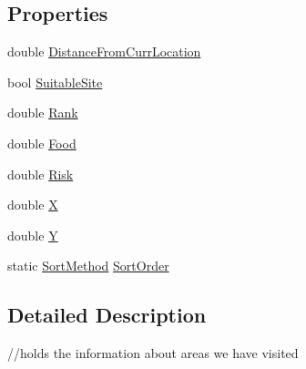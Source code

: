 \subsection*{Properties}
\begin{DoxyCompactItemize}
\item 
double \hyperlink{class_s_e_a_r_c_h_1_1_eligible_home_site_ad52a57d64d311a34d0ceb87c7c5c32ec}{Distance\-From\-Curr\-Location}
\item 
bool \hyperlink{class_s_e_a_r_c_h_1_1_eligible_home_site_ae7ebeb841ca2a0eb5ae8a69bd1897522}{Suitable\-Site}
\item 
double \hyperlink{class_s_e_a_r_c_h_1_1_eligible_home_site_a62de8ae874edce9d3786fa08e1e1eef3}{Rank}
\item 
double \hyperlink{class_s_e_a_r_c_h_1_1_eligible_home_site_addea9a16468baa964161291bd5294617}{Food}
\item 
double \hyperlink{class_s_e_a_r_c_h_1_1_eligible_home_site_af04910ec71a4c2692c0179e9c11e17f9}{Risk}
\item 
double \hyperlink{class_s_e_a_r_c_h_1_1_eligible_home_site_a19b67a7f5c936dbea9a18f05fbb8ab3f}{X}
\item 
double \hyperlink{class_s_e_a_r_c_h_1_1_eligible_home_site_a2f8dfc2534df3e398e135851dfc1d73f}{Y}
\item 
static \hyperlink{class_s_e_a_r_c_h_1_1_eligible_home_site_a072bac9d5910ce852eee90462451af81}{Sort\-Method} \hyperlink{class_s_e_a_r_c_h_1_1_eligible_home_site_a294fc71059f845e2bdacbffa32005f81}{Sort\-Order}
\end{DoxyCompactItemize}


\subsection{Detailed Description}
//holds the information about areas we have visited 



